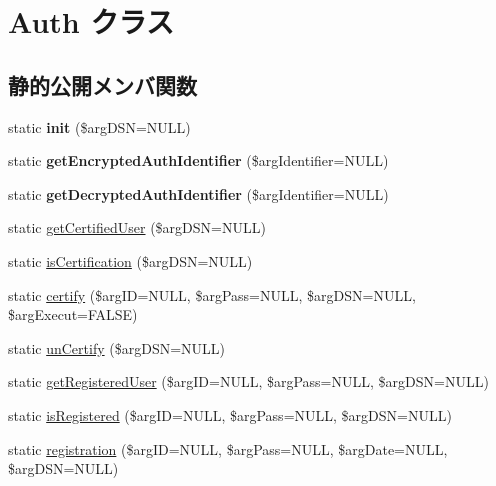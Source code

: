 \hypertarget{class_auth}{}\section{Auth クラス}
\label{class_auth}
\subsection*{静的公開メンバ関数}
\begin{DoxyCompactItemize}
\item 
\hypertarget{class_auth_a0d90d23edfa677120d1d679e6b2d4d0a}{}static {\bfseries init} (\$arg\+D\+S\+N=N\+U\+L\+L)\label{class_auth_a0d90d23edfa677120d1d679e6b2d4d0a}

\item 
\hypertarget{class_auth_a1c796b91ca73fbc3711da1c1cbee20fb}{}static {\bfseries get\+Encrypted\+Auth\+Identifier} (\$arg\+Identifier=N\+U\+L\+L)\label{class_auth_a1c796b91ca73fbc3711da1c1cbee20fb}

\item 
\hypertarget{class_auth_a30b9301ad9e08ed19f8998aa1ae7e2eb}{}static {\bfseries get\+Decrypted\+Auth\+Identifier} (\$arg\+Identifier=N\+U\+L\+L)\label{class_auth_a30b9301ad9e08ed19f8998aa1ae7e2eb}

\item 
static \hyperlink{class_auth_a39a95cdcc33ebdfe6d9fa0b1ed7a8105}{get\+Certified\+User} (\$arg\+D\+S\+N=N\+U\+L\+L)
\item 
static \hyperlink{class_auth_a41a4a347f32312fd8080a0098d3559e8}{is\+Certification} (\$arg\+D\+S\+N=N\+U\+L\+L)
\item 
static \hyperlink{class_auth_af19cda27bb71cd0f02c6eedc5d77fd5b}{certify} (\$arg\+I\+D=N\+U\+L\+L, \$arg\+Pass=N\+U\+L\+L, \$arg\+D\+S\+N=N\+U\+L\+L, \$arg\+Execut=F\+A\+L\+S\+E)
\item 
static \hyperlink{class_auth_a35214c906d67d5291aedc6ae3077a306}{un\+Certify} (\$arg\+D\+S\+N=N\+U\+L\+L)
\item 
static \hyperlink{class_auth_a239cdd7ce4421378ed50c4ee13497ec6}{get\+Registered\+User} (\$arg\+I\+D=N\+U\+L\+L, \$arg\+Pass=N\+U\+L\+L, \$arg\+D\+S\+N=N\+U\+L\+L)
\item 
static \hyperlink{class_auth_ad8e06958d26cd1033330eb0c0dcf8237}{is\+Registered} (\$arg\+I\+D=N\+U\+L\+L, \$arg\+Pass=N\+U\+L\+L, \$arg\+D\+S\+N=N\+U\+L\+L)
\item 
static \hyperlink{class_auth_adb637e94fe36d671e36571f1b44bc89c}{registration} (\$arg\+I\+D=N\+U\+L\+L, \$arg\+Pass=N\+U\+L\+L, \$arg\+Date=N\+U\+L\+L, \$arg\+D\+S\+N=N\+U\+L\+L)
\end{DoxyCompactItemize}
